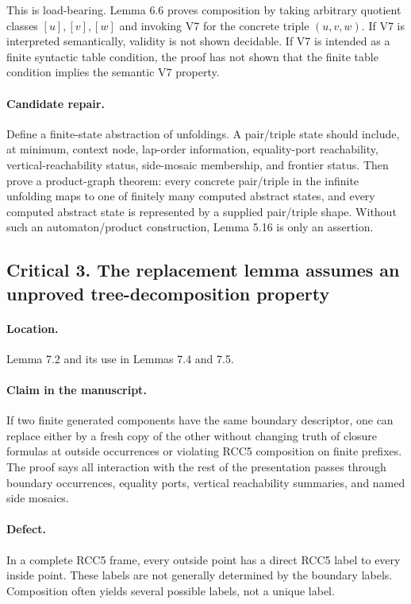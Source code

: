 \documentclass[11pt]{article}
\begin{document}
This is load-bearing. Lemma 6.6 proves composition by taking arbitrary quotient classes $[u],[v],[w]$ and invoking V7 for the concrete triple $(u,v,w)$. If V7 is interpreted semantically, validity is not shown decidable. If V7 is intended as a finite syntactic table condition, the proof has not shown that the finite table condition implies the semantic V7 property.

\paragraph{Candidate repair.} Define a finite-state abstraction of unfoldings. A pair/triple state should include, at minimum, context node, lap-order information, equality-port reachability, vertical-reachability status, side-mosaic membership, and frontier status. Then prove a product-graph theorem: every concrete pair/triple in the infinite unfolding maps to one of finitely many computed abstract states, and every computed abstract state is represented by a supplied pair/triple shape. Without such an automaton/product construction, Lemma 5.16 is only an assertion.

\subsection*{Critical 3. The replacement lemma assumes an unproved tree-decomposition property}

\paragraph{Location.} Lemma 7.2 and its use in Lemmas 7.4 and 7.5.

\paragraph{Claim in the manuscript.} If two finite generated components have the same boundary descriptor, one can replace either by a fresh copy of the other without changing truth of closure formulas at outside occurrences or violating RCC5 composition on finite prefixes. The proof says all interaction with the rest of the presentation passes through boundary occurrences, equality ports, vertical reachability summaries, and named side mosaics.

\paragraph{Defect.} In a complete RCC5 frame, every outside point has a direct RCC5 label to every inside point. These labels are not generally determined by the boundary labels. Composition often yields several possible labels, not a unique label.
\end{document}
